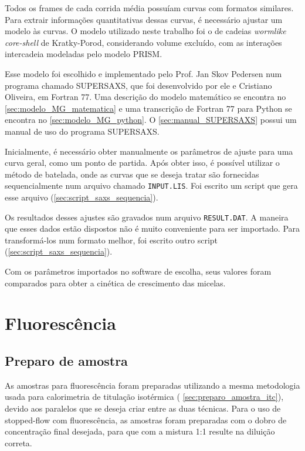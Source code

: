 			Todos os frames de cada corrida média possuíam curvas com formatos similares. Para extrair informações quantitativas dessas curvas, é necessário ajustar um modelo às curvas. O modelo utilizado neste trabalho foi o de cadeias \emph{wormlike} \emph{core-shell} de Kratky-Porod, considerando volume excluído, com as interações intercadeia modeladas pelo modelo PRISM. 
			
			Esse modelo foi escolhido e implementado pelo Prof. Jan Skov Pedersen num programa chamado SUPERSAXS, que foi desenvolvido por ele e Cristiano Oliveira, em Fortran 77. Uma descrição do modelo matemático se encontra no \autoref{sec:modelo_MG_matematica} e uma transcrição de Fortran 77 para Python se encontra no \autoref{sec:modelo_MG_python}. O \autoref{sec:manual_SUPERSAXS} possui um manual de uso do programa SUPERSAXS.
			
			Inicialmente, é necessário obter manualmente os parâmetros de ajuste para uma curva geral, como um ponto de partida. Após obter isso, é possível utilizar o método de batelada, onde as curvas que se deseja tratar são fornecidas sequencialmente num arquivo chamado \texttt{INPUT.LIS}. Foi escrito um script que gera esse arquivo (\autoref{sec:script_saxs_sequencia}). 
			
			Os resultados desses ajustes são gravados num arquivo \texttt{RESULT.DAT}. A maneira que esses dados estão dispostos não é muito conveniente para ser importado. Para transformá-los num formato melhor, foi escrito outro script (\autoref{sec:script_saxs_sequencia}).
			
			Com os parâmetros importados no software de escolha, seus valores foram comparados para obter a cinética de crescimento das micelas.
			
	\chapter{Fluorescência}  
		\section{Preparo de amostra}
		
		As amostras para fluorescência foram preparadas utilizando a mesma metodologia usada para calorimetria de titulação isotérmica ( \autoref{sec:preparo_amostra_itc}), devido aos paralelos que se deseja criar entre as duas técnicas. Para o uso de stopped-flow com fluorescência, as amostras foram preparadas com o dobro de concentração final desejada, para que com a mistura 1:1 resulte na diluição correta.
		
